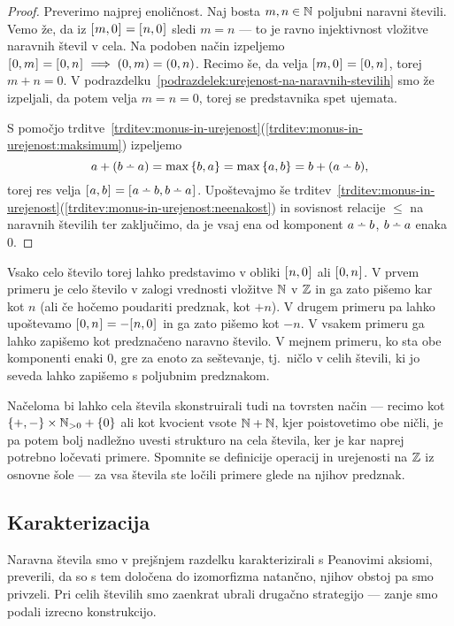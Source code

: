 \begin{proof}
Preverimo najprej enoličnost. Naj bosta $m, n \in \mathbb{N}$ poljubni naravni števili. Vemo že, da iz $[\:\!{m, 0}\:\!]_{} = [\:\!{n, 0}\:\!]_{}$ sledi $m = n$ --- to je ravno injektivnost vložitve naravnih števil v cela. Na podoben način izpeljemo $[\:\!{0, m}\:\!]_{} = [\:\!{0, n}\:\!]_{} \implies (0, m) = (0, n)$. Recimo še, da velja $[\:\!{m, 0}\:\!]_{} = [\:\!{0, n}\:\!]_{}$, torej $m + n = 0$. V podrazdelku~\ref{podrazdelek:urejenost-na-naravnih-stevilih} smo že izpeljali, da potem velja $m = n = 0$, torej se predstavnika spet ujemata.

S pomočjo trditve~\ref{trditev:monus-in-urejenost}(\ref{trditev:monus-in-urejenost:maksimum}) izpeljemo
\[a + (b \monus a) = \max\set{b, a} = \max\set{a, b} = b + (a \monus b),\]
torej res velja $\ec{a, b} = \ec{a \monus b, b \monus a}$. Upoštevajmo še trditev~\ref{trditev:monus-in-urejenost}(\ref{trditev:monus-in-urejenost:neenakost}) in sovisnost relacije $\leq$ na naravnih številih ter zaključimo, da je vsaj ena od komponent $a \monus b$, $b \monus a$ enaka $0$.
\end{proof}

Vsako celo število torej lahko predstavimo v obliki $[\:\!{n, 0}\:\!]_{}$ ali $[\:\!{0, n}\:\!]_{}$. V prvem primeru je celo število v zalogi vrednosti vložitve $\mathbb{N}$ v $\mathbb{Z}$ in ga zato pišemo kar kot $n$ (ali če hočemo poudariti predznak, kot $+n$). V drugem primeru pa lahko upoštevamo $[\:\!{0, n}\:\!]_{} = -[\:\!{n, 0}\:\!]_{}$ in ga zato pišemo kot $-n$. V vsakem primeru ga lahko zapišemo kot predznačeno naravno število. V mejnem primeru, ko sta obe komponenti enaki $0$, gre za enoto za seštevanje, tj.~ničlo v celih števili, ki jo seveda lahko zapišemo s poljubnim predznakom.

Načeloma bi lahko cela števila skonstruirali tudi na tovrsten način --- recimo kot $\set{+, -} \times \NN_{> 0} + \set{0}$ ali kot kvocient vsote $\mathbb{N} + \mathbb{N}$, kjer poistovetimo obe ničli, je pa potem bolj nadležno uvesti strukturo na cela števila, ker je kar naprej potrebno ločevati primere. Spomnite se definicije operacij in urejenosti na $\mathbb{Z}$ iz osnovne šole --- za vsa števila ste ločili primere glede na njihov predznak.


\subsection{Karakterizacija}

Naravna števila smo v prejšnjem razdelku karakterizirali s Peanovimi aksiomi, preverili, da so s tem določena do izomorfizma natančno, njihov obstoj pa smo privzeli. Pri celih številih smo zaenkrat ubrali drugačno strategijo --- zanje smo podali izrecno konstrukcijo.

